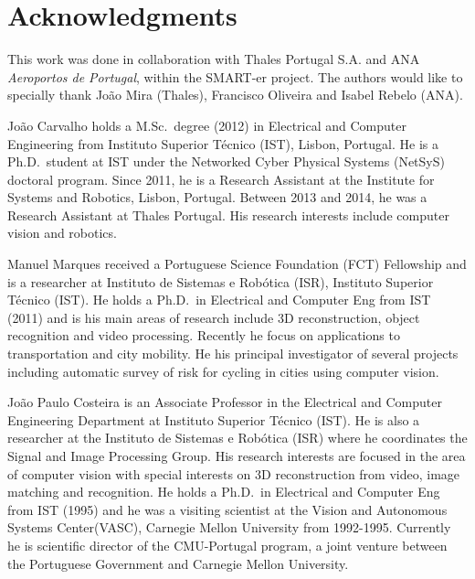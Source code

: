 \documentclass[journal]{IEEEtran}
\begin{document}

%

%

%
\section*{Acknowledgments}
\label{sec:ack}
%
This work was done in collaboration with Thales Portugal S.A. and ANA \textit{Aeroportos de Portugal}, within the SMART-er project.
The authors would like to specially thank Jo\~ao Mira (Thales), Francisco Oliveira and Isabel Rebelo (ANA).
%

%


 
\begin{IEEEbiography}{João Carvalho}
   holds a M.Sc.\ degree (2012) in Electrical and Computer Engineering from Instituto Superior Técnico (IST), Lisbon, Portugal. He is a Ph.D.\ student at IST under the Networked Cyber Physical Systems (NetSyS) doctoral program. Since 2011, he is a Research Assistant at the Institute for Systems and Robotics, Lisbon, Portugal. Between 2013 and 2014, he was a Research Assistant at Thales Portugal. His research interests include computer vision and robotics.
 \end{IEEEbiography}
 
\begin{IEEEbiography}{Manuel Marques}
    received a Portuguese Science Foundation (FCT) Fellowship and is a researcher at Instituto de Sistemas e Robótica (ISR),  Instituto Superior Técnico (IST). He holds a Ph.D.\ in Electrical and Computer Eng from IST (2011) and is his main areas of research include 3D reconstruction, object recognition and video processing. Recently he focus on applications to transportation and city mobility. He his principal investigator of several projects including automatic survey of risk for cycling in cities using computer vision. 
 \end{IEEEbiography}
 
\begin{IEEEbiography}{João Paulo Costeira}
    is an Associate Professor in the Electrical and Computer Engineering Department at Instituto Superior Técnico (IST). He is also a researcher at the Instituto de Sistemas e Robótica (ISR) where he coordinates the Signal and Image Processing Group. His research interests are focused in the area of computer vision with special interests on 3D reconstruction from video, image matching and recognition. He holds a Ph.D.\ in Electrical and Computer Eng from IST (1995) and he was a visiting scientist at the Vision and Autonomous Systems Center(VASC), Carnegie Mellon University from 1992-1995. Currently he is scientific director of the CMU-Portugal program, a joint venture between the Portuguese Government and Carnegie Mellon University. %
 \end{IEEEbiography}

\vfill
\end{document}
